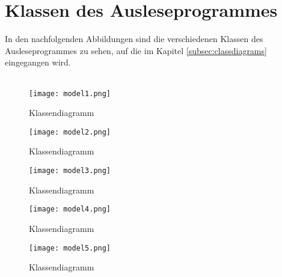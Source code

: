 \listofappendices
\label{cha:anh}
\captionsetup{list=false}







\clearpage

\section*{Klassen des Ausleseprogrammes}
\label{sec:anh:class}

In den nachfolgenden Abbildungen sind die verschiedenen Klassen des Ausleseprogrammes zu sehen, auf die im Kapitel \ref{subsec:classdiagrams} eingegangen wird.\\\\

\begin{figure}[H]
\centering
\texttt{[image: model1.png]}
\caption[]{Klassendiagramm}
\label{fig:classdia1}
\end{figure}

\begin{figure}[H]
\centering
\texttt{[image: model2.png]}
\caption[]{Klassendiagramm}
\label{fig:classdia2}
\end{figure}

\begin{figure}[H]
\centering
\texttt{[image: model3.png]}
\caption[]{Klassendiagramm}
\label{fig:classdia3}
\end{figure}

\begin{figure}[H]
\centering
\texttt{[image: model4.png]}
\caption[]{Klassendiagramm}
\label{fig:classdia4}
\end{figure}

\begin{figure}[H]
\centering
\texttt{[image: model5.png]}
\caption[]{Klassendiagramm}
\label{fig:classdia5}
\end{figure}

